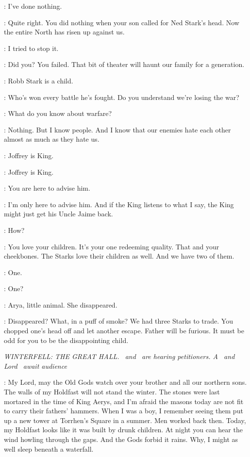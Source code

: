 \CERSEI: I've done nothing.

\TYRION: Quite right. You did nothing when your son called for Ned Stark's head. Now the entire North has risen up against us.

\CERSEI: I tried to stop it.

\TYRION: Did you? You failed. That bit of theater will haunt our family for a generation.

\CERSEI: Robb Stark is a child.

\TYRION: Who's won every battle he's fought. Do you understand we're losing the war?

\CERSEI: What do you know about warfare?

\TYRION: Nothing. But I know people. And I know that our enemies hate each other almost as much as they hate us.

\CERSEI: Joffrey is King.

\TYRION: Joffrey is King.

\CERSEI: You are here to advise him.

\TYRION: I'm only here to advise him. And if the King listens to what I say, the King might just get his Uncle Jaime back.

\CERSEI: How?

\TYRION: You love your children. It's your one redeeming quality. That and your cheekbones. The Starks love their children as well. And we have two of them.

\CERSEI: One.

\TYRION: One?

\CERSEI: Arya, little animal. She disappeared.

\TYRION: Disappeared? What, in a puff of smoke? We had three Starks to trade. You chopped one's head off and let another escape. Father will be furious. It must be odd for you to be the disappointing child.


\scene

\textit{WINTERFELL: THE GREAT HALL. \BRAN ~and \LUWIN ~are hearing petitioners.  A \NORTHERNLORD ~and Lord \PORTAN ~await audience}

\NORTHERNLORD: My Lord, may the Old Gods watch over your brother and all our northern sons. The walls of my Holdfast will not stand the winter. The stones were last mortared in the time of King Aerys, and I'm afraid the masons today are not fit to carry their fathers' hammers. When I was a boy, I remember seeing them put up a new tower at Torrhen's Square in a summer. Men worked back then. Today, my Holdfast looks like it was built by drunk children. At night you can hear the wind howling through the gaps. And the Gods forbid it rains. Why, I might as well sleep beneath a waterfall.

